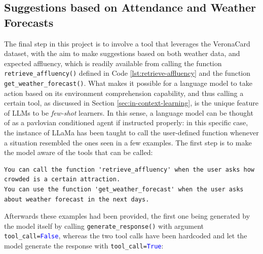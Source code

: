 \subsection{Suggestions based on Attendance and Weather Forecasts}
\label{sec:turnout}

The final step in this project is to involve a tool that leverages the VeronaCard dataset, with the aim to make suggestions based on both weather data, and expected affluency, which is readily available from calling the function \texttt{retrieve\_affluency()} defined in Code \ref{lst:retrieve-affluency} and the function \texttt{get\_weather\_forecast()}. What makes it possible for a language model to take action based on its environment comprehension capability, and thus calling a certain tool, as discussed in Section \ref{sec:in-context-learning}, is the unique feature of LLMs to be \textit{few-shot} learners. In this sense, a language model can be thought of as a pavlovian conditioned agent if instructed properly: in this specific case, the instance of LLaMa has been taught to call the user-defined function whenever a situation resembled the ones seen in a few examples.
The first step is to make the model aware of the tools that can be called:

\begin{Verbatim}[breaklines=true]
You can call the function 'retrieve_affluency' when the user asks how crowded is a certain attraction.
You can use the function 'get_weather_forecast' when the user asks about weather forecast in the next days.
\end{Verbatim}

Afterwards these examples had been provided, the first one being generated by the model itself by calling \texttt{generate\_response()} with argument \texttt{tool\_call=\textcolor{blue}{False}}, whereas the two tool calls have been hardcoded and let the model generate the response with \texttt{tool\_call=\textcolor{blue}{True}}:

